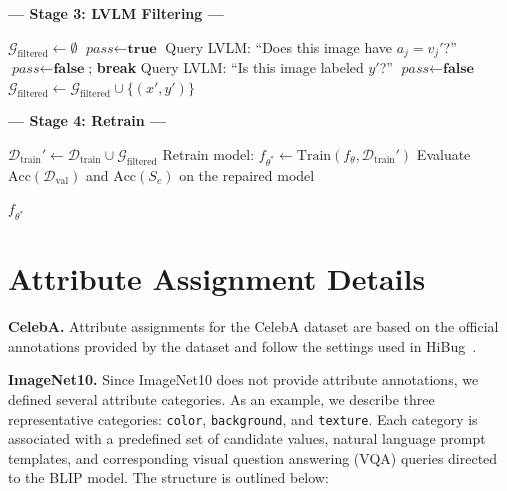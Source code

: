 \documentclass[10pt]{article} %
\newcommand{\dataset}{\mathcal{D}}
\newcommand{\hibug}{HiBug\xspace}
\begin{document}
\begin{algorithm}[H]
\begin{algorithmic}[1]
\Statex \begin{center} \textbf{--- Stage 3: LVLM Filtering ---} \end{center}

\State $\mathcal{G}_{\mathrm{filtered}} \gets \emptyset$
    \State $\textit{pass} \gets \textbf{true}$
        \State Query LVLM: ``Does this image have $a_j = v_j'$?''
            \State $\textit{pass} \gets \textbf{false}$; \textbf{break}
        \EndIf
    \EndFor
    \State Query LVLM: ``Is this image labeled $y'$?''
        \State $\textit{pass} \gets \textbf{false}$
    \EndIf
        \State $\mathcal{G}_{\mathrm{filtered}} \gets \mathcal{G}_{\mathrm{filtered}} \cup \{(x', y')\}$
    \EndIf
\EndFor

\Statex \begin{center} \textbf{--- Stage 4: Retrain ---} \end{center}

\State $\dataset_{\mathrm{train}}' \gets \dataset_{\mathrm{train}} \cup \mathcal{G}_{\mathrm{filtered}}$
\State Retrain model: $f_{\theta^*} \gets \mathrm{Train}(f_\theta, \dataset_{\mathrm{train}}')$
\State Evaluate $\mathrm{Acc}(\dataset_{\mathrm{val}})$ and
       $\mathrm{Acc}(S_e)$ on the repaired model

\State \Return $f_{\theta^*}$

\end{algorithmic}
\end{algorithm}

\section{Attribute Assignment Details}
\label{sec:attribute_assignment}

\noindent \textbf{CelebA.} Attribute assignments for the CelebA dataset are based on the official annotations provided by the dataset and follow the settings used in \hibug~\citep{chen2023hibug}.

\noindent \textbf{ImageNet10.} Since ImageNet10 does not provide attribute annotations, we defined several attribute categories. As an example, we describe three representative categories: \texttt{color}, \texttt{background}, and \texttt{texture}. Each category is associated with a predefined set of candidate values, natural language prompt templates, and corresponding visual question answering (VQA) queries directed to the BLIP model. The structure is outlined below:
\end{document}
